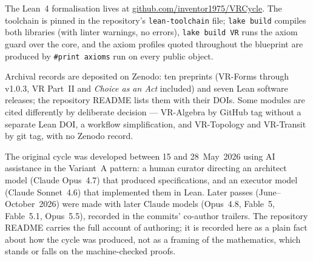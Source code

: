 The Lean~4 formalisation lives at
\href{https://github.com/inventor1975/VRCycle}{github.com/inventor1975/VRCycle}.
The toolchain is pinned in the repository's \texttt{lean-toolchain} file;
\texttt{lake build} compiles both libraries (with linter warnings, no
errors), \texttt{lake build VR} runs the axiom guard over the core, and
the axiom profiles quoted throughout the blueprint are produced by
\texttt{\#print axioms} run on every public object.

Archival records are deposited on Zenodo: ten preprints (VR-Forms
through v1.0.3, VR Part~II and \emph{Choice as an Act} included) and seven
Lean software releases; the repository README lists them with their DOIs.
Some modules are cited differently by deliberate decision --- VR-Algebra by
GitHub tag without a separate Lean DOI, a workflow simplification, and
VR-Topology and VR-Transit by git tag, with no Zenodo record.

The original cycle was developed between 15 and 28~May~2026 using AI assistance in
the Variant~A pattern: a human curator directing an architect model
(Claude Opus~4.7) that produced specifications, and an executor model
(Claude Sonnet~4.6) that implemented them in Lean.  Later passes
(June--October~2026) were made with later Claude models (Opus~4.8,
Fable~5, Fable~5.1, Opus~5.5), recorded in the commits' co-author trailers.  The repository
README carries the full account of authoring; it is recorded here as a
plain fact about how the cycle was produced, not as a framing of the
mathematics, which stands or falls on the machine-checked proofs.
